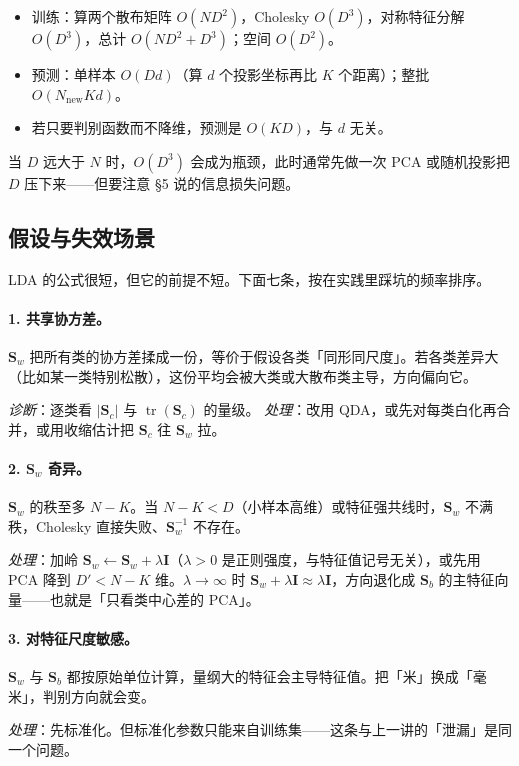 \documentclass[11pt,a4paper,fontset=windows,zihao=-4]{ctexart}
\newcommand{\bS}{\mathbf{S}}
\newcommand{\bI}{\mathbf{I}}
\DeclareMathOperator{\tr}{tr}
\begin{document}
\begin{itemize}
  \item 训练：算两个散布矩阵 $O(ND^2)$，Cholesky $O(D^3)$，对称特征分解 $O(D^3)$，总计 $O(ND^2+D^3)$；空间 $O(D^2)$。
  \item 预测：单样本 $O(Dd)$（算 $d$ 个投影坐标再比 $K$ 个距离）；整批 $O(N_{\text{new}}Kd)$。
  \item 若只要判别函数而不降维，预测是 $O(KD)$，与 $d$ 无关。
\end{itemize}

当 $D$ 远大于 $N$ 时，$O(D^3)$ 会成为瓶颈，此时通常先做一次 PCA 或随机投影把 $D$ 压下来——但要注意 \S5 说的信息损失问题。

\subsection{假设与失效场景}

LDA 的公式很短，但它的前提不短。下面七条，按在实践里踩坑的频率排序。

\paragraph{1. 共享协方差。}$\bS_w$ 把所有类的协方差揉成一份，等价于假设各类「同形同尺度」。若各类差异大（比如某一类特别松散），这份平均会被大类或大散布类主导，方向偏向它。

\emph{诊断}：逐类看 $\lvert\bS_c\rvert$ 与 $\tr(\bS_c)$ 的量级。
\emph{处理}：改用 QDA，或先对每类白化再合并，或用收缩估计把 $\bS_c$ 往 $\bS_w$ 拉。

\paragraph{2. $\bS_w$ 奇异。}$\bS_w$ 的秩至多 $N-K$。当 $N-K<D$（小样本高维）或特征强共线时，$\bS_w$ 不满秩，Cholesky 直接失败、$\bS_w^{-1}$ 不存在。

\emph{处理}：加岭 $\bS_w\leftarrow\bS_w+\lambda\bI$（$\lambda>0$ 是正则强度，与特征值记号无关），或先用 PCA 降到 $D'<N-K$ 维。$\lambda\to\infty$ 时 $\bS_w+\lambda\bI\approx\lambda\bI$，方向退化成 $\bS_b$ 的主特征向量——也就是「只看类中心差的 PCA」。

\paragraph{3. 对特征尺度敏感。}$\bS_w$ 与 $\bS_b$ 都按原始单位计算，量纲大的特征会主导特征值。把「米」换成「毫米」，判别方向就会变。

\emph{处理}：先标准化。但标准化参数只能来自训练集——这条与上一讲的「泄漏」是同一个问题。
\end{document}
